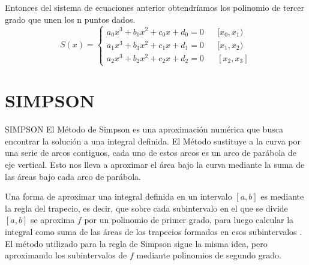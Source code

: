 \documentclass[11pt]{beamer}
\begin{document}
		\begin{frame}
			Entonces del sistema de ecuaciones anterior obtendríamos los polinomio de tercer grado que unen los n puntos dados.
			$$ S(x) = 
			\left\lbrace\begin{array}{cccc}
				a_0x^3 + b_0x^2 + c_0x + d_0 = 0 &  & [x_0,x_1) \\
				a_1x^3 + b_1x^2 + c_1x + d_1 = 0 &  & [x_1,x_2) \\
				a_2x^3 + b_2x^2 + c_2x + d_2 = 0 &  & [x_{2},x_{3}]
		    \end{array}\right.
			$$
		\end{frame}


	\section{SIMPSON}
		\begin{frame}{SIMPSON}
			El Método de Simpson es una aproximación numérica que busca encontrar la solución a una 
			integral definida.
			\vspace{0.5cm}
			El Método sustituye a la curva por una serie de arcos contiguos, cada uno de estos arcos es 
			un arco de parábola de eje vertical. Esto nos lleva a aproximar el área bajo la curva 
			mediante la suma de las áreas bajo cada arco de parábola.
		\end{frame}

		\begin{frame}
			Una forma de aproximar una integral definida en un intervalo $[a,b]$ es mediante la regla del 
			trapecio, es decir, que sobre cada subintervalo en el que se divide $[a,b]$ se aproxima $f$ 
			por un polinomio de primer grado, para luego calcular la integral como suma de las áreas de 
			los trapecios formados en esos subintervalos . El método utilizado para la regla de Simpson 
			sigue la misma idea, pero aproximando los subintervalos de $f$ mediante polinomios de segundo 
			grado.	
		\end{frame}
\end{document}
